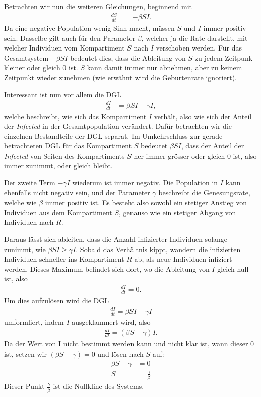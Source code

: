 \begin{refsection}
Betrachten wir nun die weiteren Gleichungen, beginnend mit 
\begin{align*}
  \frac{dS}{dt} & = -\beta S I.
\end{align*}
Da eine negative Population wenig Sinn macht, müssen $S$ und $I$ immer positiv sein. 
Dasselbe gilt auch für den Parameter $\beta$, welcher ja die Rate darstellt, mit welcher Individuen vom Kompartiment $S$ nach $I$ verschoben werden.
Für das Gesamtsystem $-\beta S I$ bedeutet dies, dass die Ableitung von $S$ zu jedem Zeitpunk kleiner oder gleich 0 ist. $S$ kann damit immer nur abnehmen, aber zu keinem Zeitpunkt wieder zunehmen (wie erwähnt wird die Geburtenrate ignoriert).

Interessant ist nun vor allem die DGL
\begin{align*}
  \frac{dI}{dt} & = \beta S I - \gamma I,
\end{align*}
welche beschreibt, wie sich das Kompartiment $I$ verhält, also wie sich der Anteil der \emph{Infected} in der Gesamtpopulation verändert.
Dafür betrachten wir die einzelnen Bestandteile der DGL separat. 
Im Umkehrschluss zur gerade betrachteten DGL für das Kompartiment $S$ bedeutet $\beta S I$, dass der Anteil der \emph{Infected} von Seiten des Kompartiments $S$ her immer grösser oder gleich 0 ist, also immer zunimmt, oder gleich bleibt.

Der zweite Term $- \gamma I$ wiederum ist immer negativ. 
Die Population in $I$ kann ebenfalls nicht negativ sein, und der Parameter $\gamma$ beschreibt die Genesungsrate, welche wie $\beta$ immer positiv ist.
Es besteht also sowohl ein stetiger Anstieg von Individuen aus dem Kompartiment $S$, genauso wie ein stetiger Abgang von Individuen nach $R$.

Daraus lässt sich ableiten, dass die Anzahl infizierter Individuen solange zunimmt, wie $\beta S I \ge \gamma I$. Sobald das Verhältnis kippt, wandern die infizierten Individuen schneller ins Kompartiment $R$ ab, als neue Individuen infiziert werden.
Dieses Maximum befindet sich dort, wo die Ableitung von $I$ gleich null ist, also
\begin{align*}
  \frac{dI}{dt} = 0.
\end{align*}
Um dies aufzulösen wird die DGL 
\begin{align*}
  \frac{dI}{dt} = \beta S I - \gamma I
\end{align*}
umformliert, indem $I$ ausgeklammert wird, also
\begin{align*}
  \frac{dI}{dt} = \left(\beta S - \gamma \right) I.
\end{align*}
Da der Wert von I nicht bestimmt werden kann und nicht klar ist, wann dieser 0 ist, setzen wir $\left(\beta S - \gamma \right) = 0$ und lösen nach $S$ auf:
\begin{align*}
  \beta S - \gamma &= 0 \\
  S &= \frac{\gamma}{\beta}
\end{align*}
Dieser Punkt $\frac{\gamma}{\beta}$ ist die Nullkline des Systems. 


\end{refsection}
